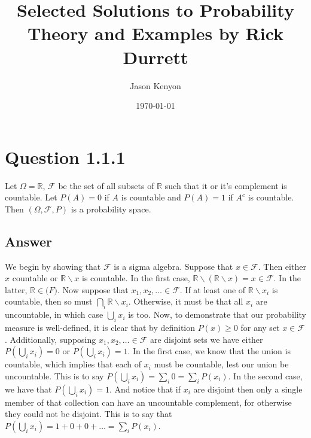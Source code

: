 \documentclass[
	12pt, %
]{fphw}
\title{Selected Solutions to Probability Theory and Examples by Rick Durrett} %
\author{Jason Kenyon} %
\date{\today} %
\institute{Binghamton University \\ Department of Mathematics} %
\begin{document}
\maketitle %


\section*{Question 1.1.1}

\begin{problem}
	Let $\Omega=\mathbb{R}$, $\mathcal{F}$ be the set of all subsets of $\mathbb{R}$ such that it or it's complement is countable. Let $P(A)=0$ if $A$ is countable and $P(A)=1$ if $A^{c}$ is countable. Then $(\Omega, \mathcal{F}, P)$ is a probability space.
\end{problem}


\subsection*{Answer}
We begin by showing that $\mathcal{F}$ is a sigma algebra. Suppose that $x \in \mathcal{F}$. Then either $x$ countable or $\mathbb{R} \backslash x$ is countable. In the first case,
$\mathbb{R} \backslash(\mathbb{R} \backslash x)=x \in \mathcal{F}$. 
In the latter, $\mathbb{R} \in \mathcal(F)$. Now suppose that
$x_1, x_2, \dots \in \mathcal{F}$. If at least one of $\mathbb{R} \backslash x_i$ is countable, then
so must $\bigcap_i\mathbb{R} \backslash x_i$. Otherwise, it must be that all $x_i$ are uncountable, in which case $\bigcup_i x_i$ is too. Now, to demonstrate that our probability measure is well-defined, it is clear that by definition $P(x)\geq 0$ for any set $x \in \mathcal{F}$. Additionally, supposing $x_1, x_2, \dots \in \mathcal{F}$ are disjoint sets
we have either $P(\bigcup_ix_i)=0$ or $P(\bigcup_ix_i)=1$. In the first case, we know that the union is countable, which implies that each of $x_i$ must be countable, lest our union be uncountable. This is to say $P(\bigcup_ix_i)=\sum_i0=\sum_iP(x_i)$. In the second case, we have that $P(\bigcup_ix_i)=1$. And notice that if $x_i$ are disjoint then only a single member of that collection can have an uncountable complement, for otherwise they could not be disjoint. This is to say that $P(\bigcup_ix_i)=1+0+0+ \dots=\sum_iP(x_i)$.
\end{document}
